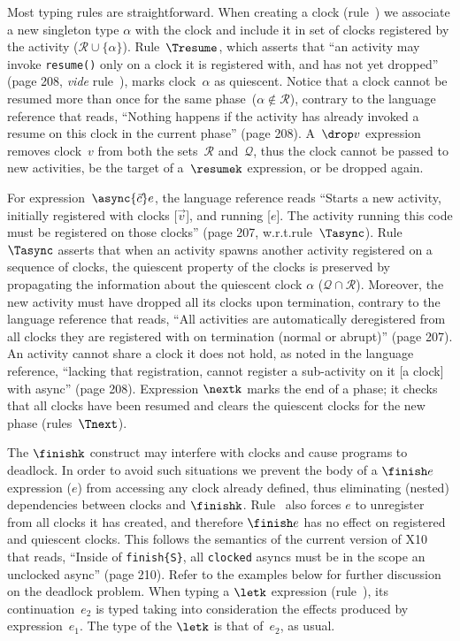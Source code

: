Most typing rules are straightforward.
When creating a clock (rule~\Tmake) we associate a new singleton type
$\alpha$ with the clock and include it in set of clocks registered by
the activity ($\mathcal R \cup \{\alpha\}$).
Rule~$\Tresume$, which asserts that ``an activity may invoke
\texttt{resume()} only on a clock it is registered with, and has not
yet dropped'' (page 208, \textit{vide} rule~\Tvar), marks clock~$\alpha$
as quiescent.
Notice that a clock cannot be resumed more than once for the same
phase~($\alpha \not \in \mathcal R$), contrary to the language
reference that reads, ``Nothing happens if the activity has already
invoked a resume on this clock in the current phase'' (page 208).
A~$\drop v$ expression removes clock~$v$ from both the sets~$\mathcal
R$ and~$\mathcal Q$, thus the clock cannot be passed to new
activities, be the target of a~$\resumek$ expression, or be dropped
again.

For expression~$\async {\vec c} e$, the language reference reads
``Starts a new activity, initially registered with clocks [$\vec v$],
and running [$e$]. The activity running this code must be registered
on those clocks'' (page 207, w.r.t.\@ rule~$\Tasync$).
Rule~$\Tasync$ asserts that when an activity spawns another
activity registered on a sequence of clocks, the quiescent property of
the clocks is preserved by propagating the information about the
quiescent clock $\alpha$ ($\mathcal {Q} \cap \mathcal R$).
Moreover, the new activity must have dropped all its clocks upon
termination, contrary to the language reference that reads, ``All
activities are automatically deregistered from all clocks they are
registered with on termination (normal or abrupt)'' (page 207).
An activity cannot share a clock it does not hold, as noted in the
language reference, ``lacking that registration, cannot register a
sub-activity on it [a clock] with async'' (page 208).
Expression $\nextk$ marks the end of a phase; it checks
that all clocks have been resumed and clears
the quiescent clocks for the new phase (rules~$\Tnext$).


The $\finishk$ construct may interfere with clocks and cause
programs to deadlock.
In order to avoid such situations we prevent the body of
a $\finish e$ expression ($e$) from accessing any clock already
defined, thus eliminating (nested) dependencies between clocks
and $\finishk$.
Rule~\Tfinish{} also forces $e$ to unregister from all clocks it has
created, and therefore $\finish e$ has no effect on registered and
quiescent clocks.
This follows the semantics of the current version of X10 that reads,
``Inside of \texttt{finish\{S\}}, all \texttt{clocked} asyncs must be
in the scope an unclocked async'' (page 210).
Refer to the examples below for further discussion on the deadlock 
problem.
When typing a $\letk$ expression (rule~\Tlet), its continuation~$e_2$
is typed taking into consideration the effects produced by
expression~$e_1$.
The type of the $\letk$ is that of~$e_2$, as usual.

